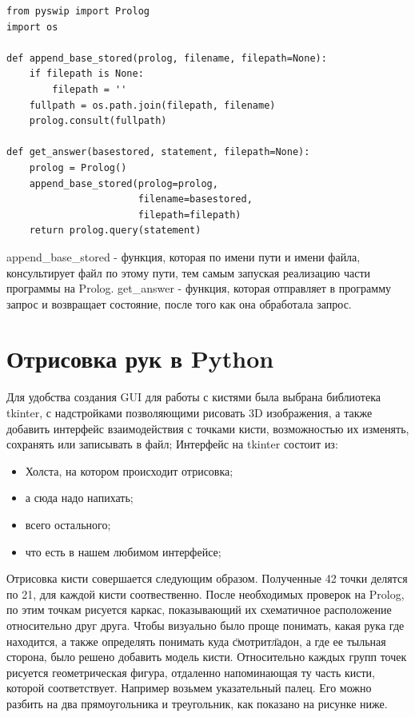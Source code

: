 \begin{lstlisting}[caption=взаимодействия python и Prolog, label=rules:PythonProlog]
from pyswip import Prolog
import os

def append_base_stored(prolog, filename, filepath=None):
    if filepath is None:
        filepath = ''    
    fullpath = os.path.join(filepath, filename)
    prolog.consult(fullpath)
    
def get_answer(basestored, statement, filepath=None):
    prolog = Prolog()
    append_base_stored(prolog=prolog, 
                       filename=basestored,
                       filepath=filepath)
    return prolog.query(statement)

\end{lstlisting}

\hspace{0.6cm}append\_base\_stored - функция, которая по имени пути и имени файла, консультирует файл по этому пути, тем самым запуская реализацию части программы на Prolog.
\hspace{0.6cm}get\_answer - функция, которая отправляет в программу запрос и возвращает состояние, после того как она обработала запрос.

\section{Отрисовка рук в Python}
\hspace{0.6cm}Для удобства создания GUI для работы с кистями была выбрана библиотека tkinter, с надстройками позволяющими рисовать 3D изображения, а также добавить интерфейс взаимодействия с точками кисти, возможностью их изменять, сохранять или записывать в файл;
\hspace{0.6cm}Интерфейс на tkinter состоит из:
\begin{itemize}
	\item Холста, на котором происходит отрисовка;
	\item а сюда надо напихать;
	\item всего остального;
	\item что есть в нашем любимом интерфейсе;
\end{itemize}
\hspace{0.6cm}Отрисовка кисти совершается следующим образом. Полученные 42 точки делятся по 21, для каждой кисти соотвественно. После необходимых проверок на Prolog, по этим точкам рисуется каркас, показывающий их схематичное расположение относительно друг друга. Чтобы визуально было проще понимать, какая рука где находится, а также определять понимать куда \"смотрит\" ладон, а где ее тыльная сторона, было решено добавить модель кисти.
\hspace{0.6cm}Относительно каждых групп точек рисуется геометрическая фигура, отдаленно напоминающая ту часть кисти, которой соответствует. Например возьмем указательный палец. Его можно разбить на два прямоугольника и треугольник, как показано на рисунке ниже.





